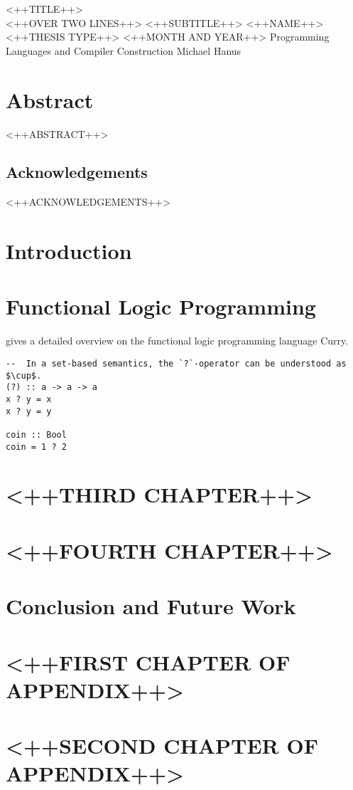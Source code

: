 \documentclass[10pt]{book}
\begin{document}
\frontmatter

\studtitlepage%
{<++TITLE++> \\[.1em]
<++OVER TWO LINES++>}%
{<++SUBTITLE++>}%
{<++NAME++>}%
{<++THESIS TYPE++>}%
{<++MONTH AND YEAR++>}%
{Programming Languages and Compiler Construction}%
{Michael Hanus}
\cleardoublepage
\eidesstatt

\chapter*{Abstract}
<++ABSTRACT++>

\section*{Acknowledgements}
<++ACKNOWLEDGEMENTS++>

\tableofcontents
\mainmatter

\chapter{Introduction}
\chapter{Functional Logic Programming}
\cite{hanus2013functional} gives a detailed overview on the functional
logic programming language Curry.

\begin{verbatim}
--  In a set-based semantics, the `?`-operator can be understood as $\cup$.
(?) :: a -> a -> a
x ? y = x
x ? y = y

coin :: Bool
coin = 1 ? 2
\end{verbatim}
\chapter{<++THIRD CHAPTER++>}
\chapter{<++FOURTH CHAPTER++>}
\chapter{Conclusion and Future Work}

\appendix
\chapter{<++FIRST CHAPTER OF APPENDIX++>}
\chapter{<++SECOND CHAPTER OF APPENDIX++>}

\backmatter
\tocbibliography
\end{document}
